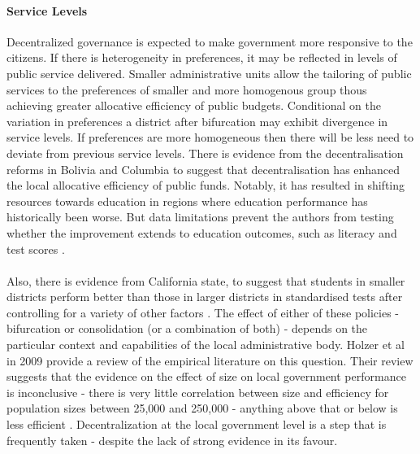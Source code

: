 \documentclass[12pt, a4paper]{article}
\begin{document}
\paragraph{Service Levels} Decentralized governance is expected to make government more responsive to the citizens. If there is heterogeneity in preferences, it may be reflected in levels of public service delivered. Smaller administrative units allow the tailoring of public services to the preferences of smaller and more homogenous group thous achieving greater allocative efficiency of public budgets. Conditional on the variation in preferences a district after bifurcation may exhibit divergence in service levels. If preferences are more homogeneous then there will be less need to deviate from previous service levels. There is evidence from the decentralisation reforms in Bolivia and Columbia to suggest that decentralisation has enhanced the local allocative efficiency of public funds. Notably, it has resulted in shifting resources towards education in regions where education performance has historically been worse. But data limitations prevent the authors from testing whether the improvement extends to education outcomes, such as literacy and test scores \parencite{faguet2008decentralization}. 

\paragraph{} Also, there is evidence from California state, to suggest that students in smaller districts perform better than those in larger districts in standardised tests after controlling for a variety of other factors \parencite{driscoll2003school}. The effect of either of these policies - bifurcation or consolidation (or a combination of both) - depends on the particular context and capabilities of the local administrative body. Holzer et al in 2009 provide a review of the empirical literature on this question. Their review suggests that the evidence on the effect of size on local government performance is inconclusive - there is very little correlation between size and efficiency for population sizes between 25,000 and 250,000 - anything above that or below is less efficient \parencite{holzer2009literature}. Decentralization at the local government level is a step that is frequently taken - despite the lack of strong evidence in its favour. 
\end{document}
